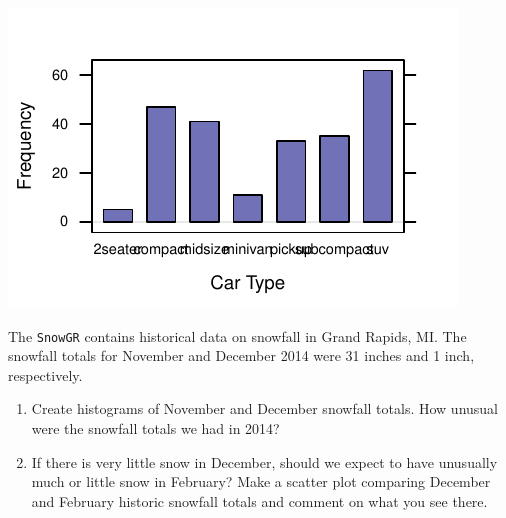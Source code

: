 \documentclass[twoside]{book}\usepackage[]{graphicx}\usepackage[]{xcolor}
\makeatletter
\def\maxwidth{ %
  \ifdim\Gin@nat@width>\linewidth
    \linewidth
  \else
    \Gin@nat@width
  \fi
}
\newenvironment{knitrout}{}{} %
\newcommand{\Rindex}[1]{\index{\texttt{#1}}}
\newcommand{\dataframe}[1]{{\color{blue!80!black}\texttt{#1}}\Rindex{#1}}
\makeatother
\begin{document}
\begin{solution}
\begin{knitrout}
{\centering \includegraphics[width=\maxwidth]{figures/fig-unnamed-chunk-27-1} 

}



\end{knitrout}
\end{solution}

\begin{problem}
	The \dataframe{SnowGR} contains historical data on snowfall in Grand Rapids, MI.
	The snowfall totals for November and December 2014 were 31 inches and 1 inch, respectively.
	\begin{enumerate}
		\item
			Create histograms of November and December snowfall totals.  How unusual were the snowfall totals we had in 2014?
		\item
			If there is very little snow in December, should we expect to have unusually much
			or little snow in February?  Make a scatter plot comparing December and February
			historic snowfall totals and comment on what you see there.
	\end{enumerate}
\end{problem}
\end{document}
